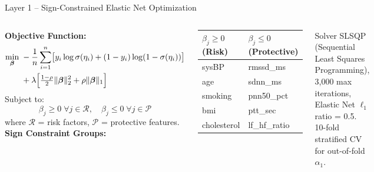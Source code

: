\documentclass[aspectratio=169]{beamer}
\begin{document}
\begin{frame}{Layer 1 -- Sign-Constrained Elastic Net Optimization}
  \begin{columns}[T]
      \textbf{Objective Function:}
      \small
      \begin{align*}
        \min_{\boldsymbol{\beta}} \;&
        -\frac{1}{n}\sum_{i=1}^n\bigl[y_i\log\sigma(\eta_i)
        + (1-y_i)\log(1-\sigma(\eta_i))\bigr] \\
        &+ \lambda\Bigl[\tfrac{1-\rho}{2}\|\boldsymbol{\beta}\|_2^2
        + \rho\|\boldsymbol{\beta}\|_1\Bigr]
      \end{align*}
      Subject to:
      \[
        \beta_j \geq 0 \;\forall j \in \mathcal{R},\quad
        \beta_j \leq 0 \;\forall j \in \mathcal{P}
      \]
      where $\mathcal{R}$ = risk factors, $\mathcal{P}$ = protective features.
      \textbf{Sign Constraint Groups:}
      \begin{center}\small
      \begin{tabular}{@{}ll@{}}
        \toprule
        \textbf{$\beta_j \geq 0$ (Risk)} & \textbf{$\beta_j \leq 0$ (Protective)} \\
        \midrule
        sysBP      & rmssd\_ms \\
        age        & sdnn\_ms \\
        smoking    & pnn50\_pct \\
        bmi        & ptt\_sec \\
        cholesterol & lf\_hf\_ratio \\
        \bottomrule
      \end{tabular}
      \end{center}
      \begin{block}{Solver}
        SLSQP (Sequential Least Squares Programming),
        3,000 max iterations, Elastic Net $\ell_1$ ratio = 0.5.
        10-fold stratified CV for out-of-fold $\alpha_1$.
      \end{block}
  \end{columns}
\end{frame}
\end{document}
